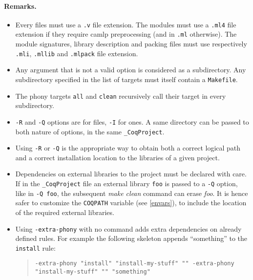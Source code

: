 \paragraph{Remarks.}

\begin{itemize}
\item Every {\Coq} files must use a \texttt{.v} file extension.
 The {\ocaml} modules must use a \texttt{.ml4} file extension
 if they require camlp preprocessing (and in \texttt{.ml} otherwise).
 The {\ocaml} module signatures, library
 description and packing files must use respectively \texttt{.mli},
 \texttt{.mllib} and \texttt{.mlpack} file extension.

\item Any argument that is not a valid option is considered as a
  subdirectory. Any subdirectory specified in the list of targets must
  itself contain a \texttt{Makefile}.

\item The phony targets \texttt{all} and \texttt{clean} recursively
  call their target in every subdirectory.

\item \texttt{-R} and \texttt{-Q} options are for {\Coq} files, \texttt{-I}
  for {\ocaml} ones. A same directory can be passed to both nature of
  options, in the same \texttt{\_CoqProject}.

\item Using \texttt{-R} or \texttt{-Q} is the appropriate way to
  obtain both a correct logical path and a correct installation location to
  the libraries of a given project.

\item Dependencies on external libraries to the project must be
  declared with care. If in the \texttt{\_CoqProject} file an external
  library \texttt{foo} is passed to a \texttt{-Q} option, like in
  \texttt{-Q foo}, the subsequent \textit{make clean} command can
  erase \textit{foo}. It is hence safer to customize the
  \texttt{COQPATH} variable (see \ref{envars}), to include the
  location of the required external libraries.

\item Using \texttt{-extra-phony} with no command adds extra
  dependencies on already defined rules. For example the following
  skeleton appends ``something'' to the \texttt{install} rule:
\begin{quotation}
\texttt{-extra-phony "install" "install-my-stuff" ""
  -extra-phony "install-my-stuff" "" "something"}
\end{quotation}
\end{itemize}


